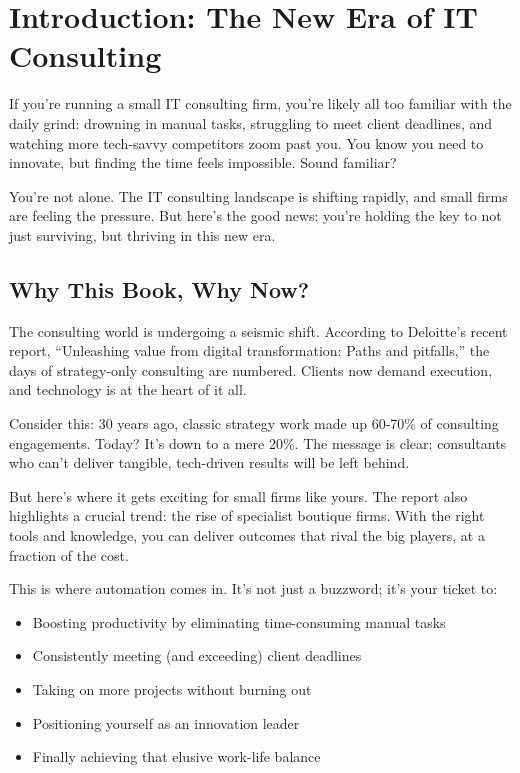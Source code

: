 \chapter*{Introduction: The New Era of IT Consulting}



If you're running a small IT consulting firm, you're likely all too familiar with the daily grind: drowning in manual tasks, struggling to meet client deadlines, and watching more tech-savvy competitors zoom past you. You know you need to innovate, but finding the time feels impossible. Sound familiar?

You're not alone. The IT consulting landscape is shifting rapidly, and small firms are feeling the pressure. But here's the good news: you're holding the key to not just surviving, but thriving in this new era.


\section{Why This Book, Why Now?}

The consulting world is undergoing a seismic shift. According to Deloitte's recent report, ``Unleashing value from digital transformation: Paths and pitfalls,'' the days of strategy-only consulting are numbered. Clients now demand execution, and technology is at the heart of it all.

Consider this: 30 years ago, classic strategy work made up 60-70\% of consulting engagements. Today? It's down to a mere 20\%. The message is clear: consultants who can't deliver tangible, tech-driven results will be left behind.

But here's where it gets exciting for small firms like yours. The report also highlights a crucial trend: the rise of specialist boutique firms. With the right tools and knowledge, you can deliver outcomes that rival the big players, at a fraction of the cost.

This is where automation comes in. It's not just a buzzword; it's your ticket to:
\begin{itemize}
    \item Boosting productivity by eliminating time-consuming manual tasks
    \item Consistently meeting (and exceeding) client deadlines
    \item Taking on more projects without burning out
    \item Positioning yourself as an innovation leader
    \item Finally achieving that elusive work-life balance
\end{itemize}


